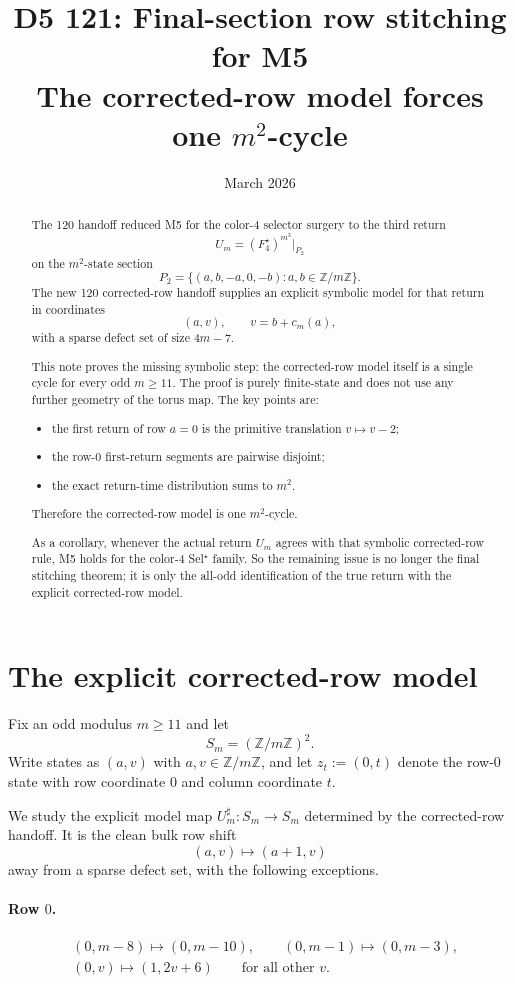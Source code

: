 \documentclass[11pt]{article}
\title{D5 121: Final-section row stitching for M5\\
The corrected-row model forces one $m^2$-cycle}
\author{}
\date{March 2026}
\newcommand{\Z}{\mathbb Z}
\newcommand{\Sm}{S_m}
\newcommand{\Um}{U_m^{\sharp}}
\begin{document}
\maketitle

\begin{abstract}
The 120 handoff reduced M5 for the color-$4$ selector surgery to the third
return
\[
U_m=(F_4^{\star})^{m^3}\big|_{P_2}
\]
on the $m^2$-state section
\[
P_2=\{(a,b,-a,0,-b):a,b\in\Z/m\Z\}.
\]
The new 120 corrected-row handoff supplies an explicit symbolic model for that
return in coordinates
\[
(a,v),\qquad v=b+c_m(a),
\]
with a sparse defect set of size $4m-7$.

This note proves the missing symbolic step: the corrected-row model itself is a
single cycle for every odd $m\ge 11$. The proof is purely finite-state and does
not use any further geometry of the torus map. The key points are:
\begin{itemize}[leftmargin=2.0em]
\item the first return of row $a=0$ is the primitive translation
      $v\mapsto v-2$;
\item the row-$0$ first-return segments are pairwise disjoint;
\item the exact return-time distribution sums to $m^2$.
\end{itemize}
Therefore the corrected-row model is one $m^2$-cycle.

As a corollary, whenever the actual return $U_m$ agrees with that symbolic
corrected-row rule, M5 holds for the color-$4$ Sel$^{\star}$ family. So the
remaining issue is no longer the final stitching theorem; it is only the
all-odd identification of the true return with the explicit corrected-row
model.
\end{abstract}

\section{The explicit corrected-row model}

Fix an odd modulus $m\ge 11$ and let
\[
\Sm=(\Z/m\Z)^2.
\]
Write states as $(a,v)$ with $a,v\in\Z/m\Z$, and let $z_t:=(0,t)$ denote the
row-$0$ state with row coordinate $0$ and column coordinate $t$.

We study the explicit model map $\Um:\Sm\to\Sm$ determined by the corrected-row
handoff. It is the clean bulk row shift
\[
(a,v)\mapsto (a+1,v)
\]
away from a sparse defect set, with the following exceptions.

\paragraph{Row $0$.}
\begin{align*}
&(0,m-8)\mapsto (0,m-10),\qquad (0,m-1)\mapsto (0,m-3),\\
&(0,v)\mapsto (1,2v+6)\qquad\text{for all other }v.
\end{align*}
\end{document}
